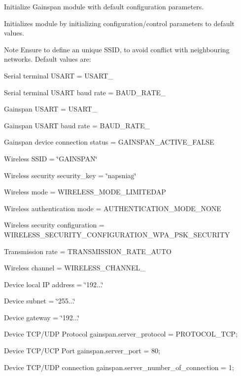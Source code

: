 Initialize Gainspan module with default configuration parameters. 

Initializes module by initializing configuration/control parameters to default values. \begin{DoxyNote}{Note}
Ensure to define an unique S\+S\+ID, to avoid conflict with neighbouring networks. Default values are\+:
\begin{DoxyItemize}
\item Serial terminal U\+S\+A\+RT = U\+S\+A\+R\+T\+\_
\item Serial terminal U\+S\+A\+RT baud rate = B\+A\+U\+D\+\_\+\+R\+A\+T\+E\+\_
\item Gainspan U\+S\+A\+RT = U\+S\+A\+R\+T\+\_
\item Gainspan U\+S\+A\+RT baud rate = B\+A\+U\+D\+\_\+\+R\+A\+T\+E\+\_
\item Gainspan device connection status = G\+A\+I\+N\+S\+P\+A\+N\+\_\+\+A\+C\+T\+I\+V\+E\+\_\+\+F\+A\+L\+SE
\item Wireless S\+S\+ID = \char`\"{}\+G\+A\+I\+N\+S\+P\+A\+N\char`\"{}
\item Wireless security security\+\_\+key = \char`\"{}napsniag\char`\"{}
\item Wireless mode = W\+I\+R\+E\+L\+E\+S\+S\+\_\+\+M\+O\+D\+E\+\_\+\+L\+I\+M\+I\+T\+E\+D\+AP
\item Wireless authentication mode = A\+U\+T\+H\+E\+N\+T\+I\+C\+A\+T\+I\+O\+N\+\_\+\+M\+O\+D\+E\+\_\+\+N\+O\+NE
\item Wireless security configuration = W\+I\+R\+E\+L\+E\+S\+S\+\_\+\+S\+E\+C\+U\+R\+I\+T\+Y\+\_\+\+C\+O\+N\+F\+I\+G\+U\+R\+A\+T\+I\+O\+N\+\_\+\+W\+P\+A\+\_\+\+P\+S\+K\+\_\+\+S\+E\+C\+U\+R\+I\+TY
\item Transmission rate = T\+R\+A\+N\+S\+M\+I\+S\+S\+I\+O\+N\+\_\+\+R\+A\+T\+E\+\_\+\+A\+U\+TO
\item Wireless channel = W\+I\+R\+E\+L\+E\+S\+S\+\_\+\+C\+H\+A\+N\+N\+E\+L\+\_
\item Device local IP address = \char`\"{}192...\char`\"{}
\item Device subnet = \char`\"{}255...\char`\"{}
\item Device gateway = \char`\"{}192...\char`\"{}
\item Device T\+C\+P/\+U\+DP Protocol gainspan.\+server\+\_\+protocol = P\+R\+O\+T\+O\+C\+O\+L\+\_\+\+T\+CP;
\item Device T\+C\+P/\+U\+CP Port gainspan.\+server\+\_\+port = 80;
\item Device T\+C\+P/\+U\+DP connection gainspan.\+server\+\_\+number\+\_\+of\+\_\+connection = 1;

\end{DoxyItemize}
\end{DoxyNote}
